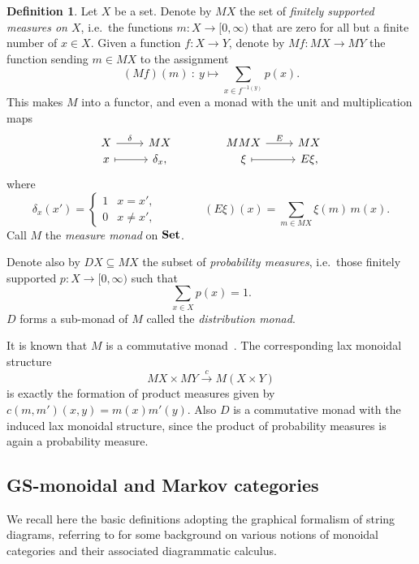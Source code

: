 \documentclass[a4paper,UKenglish,numberwithinsect,cleveref, autoref, thm-restate]{lipics-v2021}
\theoremstyle{plain} %
\theoremstyle{definition} %
\newtheorem{mydefinition}[mytheorem]{Definition}
\begin{document}
\begin{mydefinition}\label{monadM}
 Let $X$ be a set. Denote by $MX$ the set of \emph{finitely supported measures on $X$}, i.e.~the functions $m:X\to[0,\infty)$ 
 that are zero for all but a finite number of $x\in X$. 
 Given a function $f:X\to Y$, denote by $Mf:MX\to MY$ the function sending $m\in MX$ to the assignment
 \[
	 (Mf)(m) \: : \: y \longmapsto \sum_{x\in f^{-1(y)}} p(x) .
 \]
 This makes $M$ into a functor, and even a monad with the unit and multiplication maps
 \[
  \begin{tikzcd}[row sep=0]
   X \ar{r}{\delta} & MX \\
   x \ar[mapsto]{r} & \delta_x ,
  \end{tikzcd}
  \qquad\qquad
  \begin{tikzcd}[row sep=0]
   MMX \ar{r}{E} & MX \\
   \xi \ar[mapsto]{r} & E\xi ,
  \end{tikzcd}
 \]
 where 
 \[
  \delta_x(x') = \begin{cases}
                  1 & x=x' , \\
                  0 & x\ne x',
                 \end{cases}
 \qquad\qquad
 (E\xi)(x) = \sum_{m\in MX} \xi(m)\,m(x) .
 \]
 Call $M$ the \emph{measure monad} on $\mathbf{Set}$.

 Denote also by $DX\subseteq MX$ the subset of \emph{probability measures}, i.e.~those finitely supported $p:X\to[0,\infty)$ such that
 \[
  \sum_{x\in X} p(x) = 1 .
 \]
 $D$ forms a sub-monad of $M$ called the \emph{distribution monad}.
\end{mydefinition}

It is known that $M$ is a commutative monad~\cite{coumans2013scalars}.
The corresponding lax monoidal structure
\[
	MX \times MY \stackrel{c}{\longrightarrow} M(X \times Y)
\]
is exactly the formation of product measures given by $c(m, m')(x, y) = m(x) m'(y)$.
Also $D$ is a commutative monad with the induced lax monoidal structure, 
since the product of probability measures is again a probability measure.

\subsection{GS-monoidal and Markov categories}


We recall here the basic definitions adopting the graphical formalism of string diagrams,
referring to \cite{Selinger2011} for some background on various notions of monoidal categories and their associated diagrammatic calculus.
\end{document}
